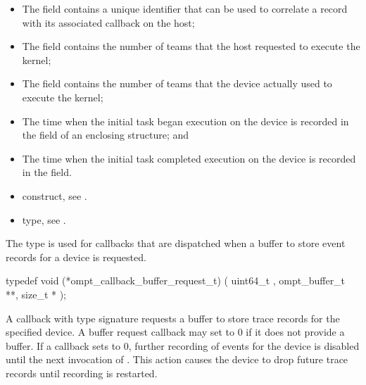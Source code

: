 \begin{itemize}
\item The  field contains a unique identifier that can be used 
      to correlate a  record with its associated 
       callback on the host;
\item The  field contains the number of teams that the 
      host requested to execute the kernel;
\item The  field contains the number of teams that the 
      device actually used to execute the kernel;
\item The time when the initial task began execution on the device is recorded 
      in the  field of an enclosing  structure; and
\item The time when the initial task completed execution on the device is recorded 
      in the  field.
\end{itemize}

\crossreferences
\begin{itemize}
\item {} construct, see .

\item {} type, see .
\end{itemize}



\label{sec:ompt_callback_buffer_request_t}

\summary
The  type is used for callbacks that are
dispatched when a buffer to store event records for a device is requested.

\format
\begin{ccppspecific}
\begin{omptCallback}
typedef void (*ompt_callback_buffer_request_t) (
  uint64_t ,
  ompt_buffer_t **,
  size_t *
);
\end{omptCallback}
\end{ccppspecific}

\descr
A callback with type signature   requests 
a buffer to store trace records for the specified device. A buffer request 
callback may set  to 0 if it does not provide a buffer. If a 
callback sets  to 0, further recording of events for the device is
disabled until the next invocation of . This action
causes the device to drop future trace records until recording is restarted.

